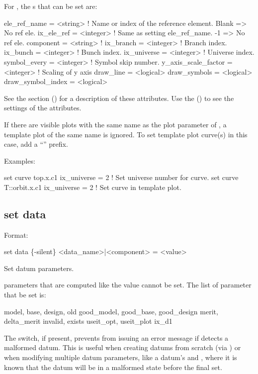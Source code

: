 {{For , the s that can be set are:
\begin{example}
  ele_ref_name        = <string>  ! Name or index of the reference element. Blank => No ref ele.
  ix_ele_ref          = <integer> ! Same as setting ele_ref_name. -1 => No ref ele.
  component           = <string>  ! 
  ix_branch           = <integer> ! Branch index.
  ix_bunch            = <integer> ! Bunch index.
  ix_universe         = <integer> ! Universe index.
  symbol_every        = <integer> ! Symbol skip number.
  y_axis_scale_factor = <integer> ! Scaling of y axis
  draw_line           = <logical> 
  draw_symbols        = <logical> 
  draw_symbol_index   = <logical> 
\end{example}
See the  section () for a description of these attributes.  Use
the  () to see the settings of the attributes.

If there are visible plots with the same name as the plot parameter of , a template plot
of the same name is ignored. To set template plot curve(s) in this case, add a ``'' prefix.

Examples:
\begin{example}
  set curve top.x.c1 ix_universe = 2       ! Set universe number for curve.
  set curve T::orbit.x.c1 ix_universe = 2  ! Set curve in template plot.
\end{example}


\subsection{set data}
\label{s:set.data}

Format:
\begin{example}
  set data \{-silent\} <data_name>|<component> = <value>
\end{example}
Set datum parameters.

parameters that are computed like the  value cannot be set. The list of parameter
that  be set is:
\begin{example}
  model, base, design, old
  good_model, good_base, good_design
  merit, delta_merit
  invalid, exists
  useit_opt, useit_plot
  ix_d1
\end{example}

The  switch, if present, prevents \tao from issuing an error message if \tao detects a
malformed datum. This is useful when creating datums from scratch (via )
or when modifying multiple datum parameters, like a datum's  and ,
where it is known that the datum will be in a malformed state before the final set.

}}
